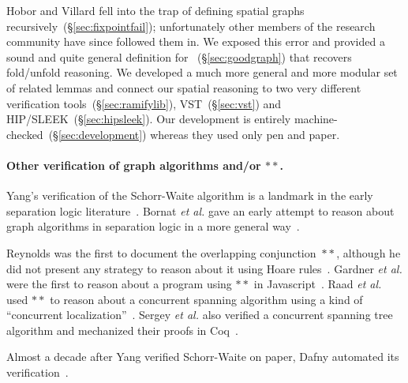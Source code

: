 Hobor and Villard fell into the trap of defining spatial graphs recursively~(\S\ref{sec:fixpointfail}); unfortunately other members of the research community have since followed them in.  We exposed this error and provided a sound and quite general definition for ~(\S\ref{sec:goodgraph}) that recovers fold/unfold reasoning.  We developed a much more general and more modular set of related lemmas and connect our spatial reasoning to two very different verification tools~(\S\ref{sec:ramifylib}), VST~(\S\ref{sec:vst}) and HIP/SLEEK~(\S\ref{sec:hipsleek}).  Our development is entirely machine-checked~(\S\ref{sec:development}) whereas they used only pen and paper.
\fi

\paragraph{Other verification of graph algorithms and/or $**$.}
Yang's verification of the Schorr-Waite algorithm is a landmark in the early separation logic literature~\cite{hongseok:phd}.  Bornat \emph{et al.} gave an early attempt to reason about graph algorithms in separation logic in a more general way~\cite{bornat:aliasing04}.

Reynolds was the first to document the overlapping conjunction~$**$, although he did not present any strategy to reason about it using Hoare rules~\cite{rey-slnotes}.  Gardner \emph{et al.} were the first to reason about a program using $**$ in Javascript~\cite{GardnerMS12}.  Raad \emph{et al.} used $**$ to reason about a concurrent spanning algorithm using a kind of ``concurrent localization''~\cite{RaadVG15}.  Sergey \emph{et al.} also verified a concurrent spanning tree algorithm and mechanized their proofs in Coq~\cite{ilya-graphs}.

Almost a decade after Yang verified Schorr-Waite on paper, Dafny automated its verification~\cite{Leino10}.


